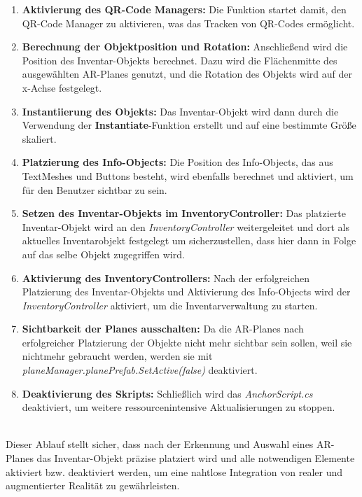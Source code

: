 \begin{enumerate}
    \item \textbf{Aktivierung des QR-Code Managers:} Die Funktion startet damit, den QR-Code Manager zu aktivieren,
    was das Tracken von QR-Codes ermöglicht.
    \item \textbf{Berechnung der Objektposition und Rotation:} Anschließend wird die Position des Inventar-Objekts
    berechnet. Dazu wird die Flächenmitte des ausgewählten AR-Planes genutzt, und die Rotation des Objekts wird auf
    der x-Achse festgelegt.
    \item \textbf{Instantiierung des Objekts:} Das Inventar-Objekt wird dann durch die Verwendung der
    \textbf{Instantiate}-Funktion erstellt und auf eine bestimmte Größe skaliert.
    \item \textbf{Platzierung des Info-Objects:} Die Position des Info-Objects, das aus TextMeshes und Buttons besteht,
    wird ebenfalls berechnet und aktiviert, um für den Benutzer sichtbar zu sein.
    \item \textbf{Setzen des Inventar-Objekts im InventoryController:} Das platzierte Inventar-Objekt wird an den
    \textit{InventoryController} weitergeleitet und dort als aktuelles Inventarobjekt festgelegt um sicherzustellen,
    dass hier dann in Folge auf das selbe Objekt zugegriffen wird.
    \item \textbf{Aktivierung des InventoryControllers:} Nach der erfolgreichen Platzierung des Inventar-Objekts und
    Aktivierung des Info-Objects wird der \textit{InventoryController} aktiviert, um die Inventarverwaltung zu starten.
    \item \textbf{Sichtbarkeit der Planes ausschalten:} Da die AR-Planes nach erfolgreicher Platzierung der Objekte nicht
    mehr sichtbar sein sollen, weil sie nichtmehr gebraucht werden, werden sie mit
    \textit{planeManager.planePrefab.SetActive(false)} deaktiviert.
    \item \textbf{Deaktivierung des Skripts:} Schließlich wird das \textit{AnchorScript.cs} deaktiviert, um weitere
    ressourcenintensive Aktualisierungen zu stoppen.
\end{enumerate}\\

Dieser Ablauf stellt sicher, dass nach der Erkennung und Auswahl eines AR-Planes das Inventar-Objekt präzise platziert
wird und alle notwendigen Elemente aktiviert bzw. deaktiviert werden, um eine nahtlose Integration von realer und
augmentierter Realität zu gewährleisten.

